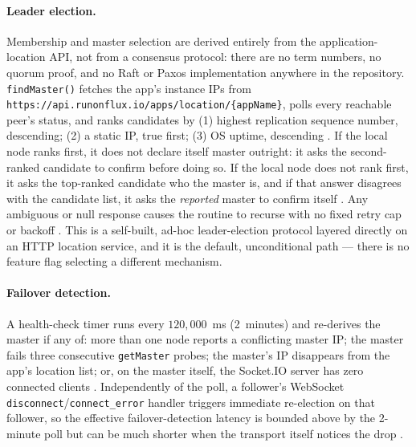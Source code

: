 \paragraph{Leader election.} Membership and master selection are derived entirely from
the \FluxOS application-location API, not from a consensus protocol: there are no term
numbers, no quorum proof, and no Raft or Paxos implementation anywhere in the
repository. \texttt{findMaster()} fetches the app's instance IPs from
\texttt{https://api.runonflux.io/apps/location/\{appName\}}, polls every reachable
peer's status, and ranks candidates by (1) highest replication sequence number,
descending; (2) a static IP, true first; (3) OS uptime, descending
. If the local node
ranks first, it does not declare itself master outright: it asks the second-ranked
candidate to confirm before doing so. If the local node does not rank first, it asks
the top-ranked candidate who the master is, and if that answer disagrees with the
candidate list, it asks the \emph{reported} master to confirm itself
. Any ambiguous or null
response causes the routine to recurse with no fixed retry cap or backoff
. This is a
self-built, ad-hoc leader-election protocol layered directly on an HTTP location
service, and it is the default, unconditional path --- there is no feature flag
selecting a different mechanism.

\paragraph{Failover detection.} A health-check timer runs every $120{,}000$~ms
(2~minutes) and re-derives the master if any of: more than one node reports a
conflicting master IP; the master fails three consecutive \texttt{getMaster} probes;
the master's IP disappears from the app's location list; or, on the master itself, the
Socket.IO server has zero connected clients
. Independently of the
poll, a follower's WebSocket \texttt{disconnect}\slash\texttt{connect\_error} handler
triggers immediate re-election on that follower, so the effective failover-detection
latency is bounded above by the 2-minute poll but can be much shorter when the
transport itself notices the drop
.

